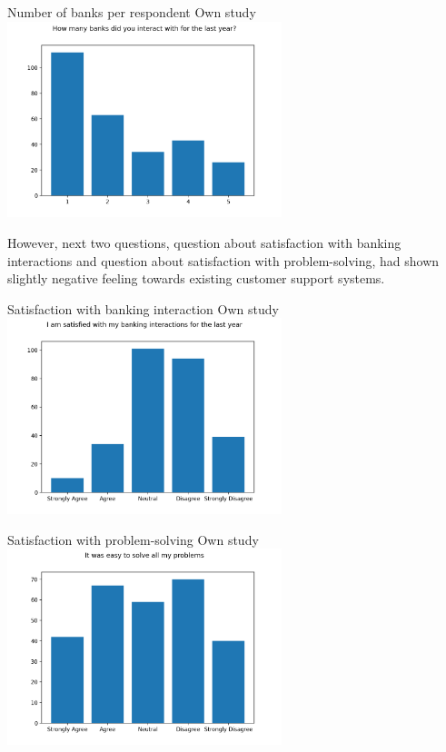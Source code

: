 \mtfigure
{Number of banks per respondent}
{Own study}
{
    \includegraphics[width=0.6\textwidth,height=\textheight,keepaspectratio]{survey/2_how_many_banks_did_you_interact_with_for_the_last_year.png}
}

However, next two questions, question about satisfaction with banking interactions and question about satisfaction with problem-solving, had shown slightly negative feeling towards existing customer support systems.

\mtfigure
{Satisfaction with banking interaction}
{Own study}
{
    \includegraphics[width=0.6\textwidth,height=\textheight,keepaspectratio]{survey/3_i_am_satisfied_with_my_banking_interactions_for_the_last_year.png}
}

\mtfigure
{Satisfaction with problem-solving}
{Own study}
{
    \includegraphics[width=0.6\textwidth,height=\textheight,keepaspectratio]{survey/4_it_was_easy_to_solve_all_my_problems.png}
}

